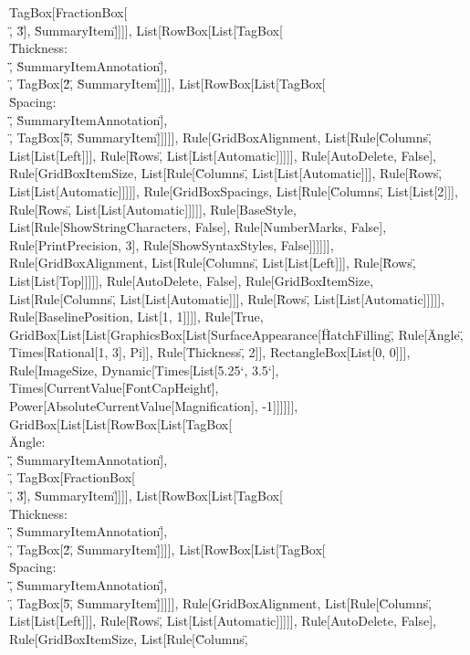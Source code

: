 \documentclass{article}
\begin{document}
{{{{TagBox[FractionBox[\"\\[Pi]\", \"3\"], \"SummaryItem\"]]]], List[RowBox[List[TagBox[\"\\\"Thickness: \\\"\", \"SummaryItemAnnotation\"], \"\\[InvisibleSpace]\",
TagBox[\"2\", \"SummaryItem\"]]]], List[RowBox[List[TagBox[\"\\\"Spacing: \\\"\", \"SummaryItemAnnotation\"], \"\\[InvisibleSpace]\", TagBox[\"5\",
\"SummaryItem\"]]]]], Rule[GridBoxAlignment, List[Rule[\"Columns\", List[List[Left]]], Rule[\"Rows\", List[List[Automatic]]]]], Rule[AutoDelete,
False], Rule[GridBoxItemSize, List[Rule[\"Columns\", List[List[Automatic]]], Rule[\"Rows\", List[List[Automatic]]]]], Rule[GridBoxSpacings, List[Rule[\"Columns\",
List[List[2]]], Rule[\"Rows\", List[List[Automatic]]]]], Rule[BaseStyle, List[Rule[ShowStringCharacters, False], Rule[NumberMarks, False], Rule[PrintPrecision,
3], Rule[ShowSyntaxStyles, False]]]]]], Rule[GridBoxAlignment, List[Rule[\"Columns\", List[List[Left]]], Rule[\"Rows\", List[List[Top]]]]], Rule[AutoDelete,
False], Rule[GridBoxItemSize, List[Rule[\"Columns\", List[List[Automatic]]], Rule[\"Rows\", List[List[Automatic]]]]], Rule[BaselinePosition, List[1,
1]]]], Rule[True, GridBox[List[List[GraphicsBox[List[SurfaceAppearance[\"HatchFilling\", Rule[\"Angle\", Times[Rational[1, 3], Pi]], Rule[\"Thickness\",
2]], RectangleBox[List[0, 0]]], Rule[ImageSize, Dynamic[Times[List[5.25`, 3.5`], Times[CurrentValue[\"FontCapHeight\"], Power[AbsoluteCurrentValue[Magnification],
-1]]]]]], GridBox[List[List[RowBox[List[TagBox[\"\\\"Angle: \\\"\", \"SummaryItemAnnotation\"], \"\\[InvisibleSpace]\", TagBox[FractionBox[\"\\[Pi]\",
\"3\"], \"SummaryItem\"]]]], List[RowBox[List[TagBox[\"\\\"Thickness: \\\"\", \"SummaryItemAnnotation\"], \"\\[InvisibleSpace]\", TagBox[\"2\", \"SummaryItem\"]]]],
List[RowBox[List[TagBox[\"\\\"Spacing: \\\"\", \"SummaryItemAnnotation\"], \"\\[InvisibleSpace]\", TagBox[\"5\", \"SummaryItem\"]]]]], Rule[GridBoxAlignment,
List[Rule[\"Columns\", List[List[Left]]], Rule[\"Rows\", List[List[Automatic]]]]], Rule[AutoDelete, False], Rule[GridBoxItemSize, List[Rule[\"Columns\",
}}}}
\end{document}
